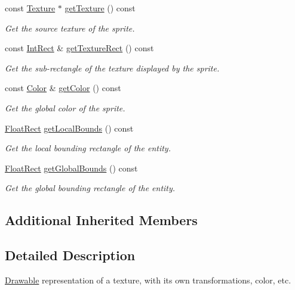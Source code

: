 \begin{DoxyCompactItemize}
const \hyperlink{classsf_1_1_texture}{Texture} $\ast$ \hyperlink{classsf_1_1_sprite_a1a76155146c8ff37c4eb5a306b4e9ebe}{get\+Texture} () const
\begin{DoxyCompactList}\small\item\em Get the source texture of the sprite. \end{DoxyCompactList}\item 
const \hyperlink{classsf_1_1_rect}{Int\+Rect} \& \hyperlink{classsf_1_1_sprite_a3492896fe7b63f58ae022c5b8bec5c98}{get\+Texture\+Rect} () const
\begin{DoxyCompactList}\small\item\em Get the sub-\/rectangle of the texture displayed by the sprite. \end{DoxyCompactList}\item 
const \hyperlink{classsf_1_1_color}{Color} \& \hyperlink{classsf_1_1_sprite_ac5f419f37b4e38f7a94186e3a3e303e1}{get\+Color} () const
\begin{DoxyCompactList}\small\item\em Get the global color of the sprite. \end{DoxyCompactList}\item 
\hyperlink{classsf_1_1_rect}{Float\+Rect} \hyperlink{classsf_1_1_sprite_ab2f4c781464da6f8a52b1df6058a48b8}{get\+Local\+Bounds} () const
\begin{DoxyCompactList}\small\item\em Get the local bounding rectangle of the entity. \end{DoxyCompactList}\item 
\hyperlink{classsf_1_1_rect}{Float\+Rect} \hyperlink{classsf_1_1_sprite_aa795483096b90745b2e799532963e271}{get\+Global\+Bounds} () const
\begin{DoxyCompactList}\small\item\em Get the global bounding rectangle of the entity. \end{DoxyCompactList}\end{DoxyCompactItemize}
\subsection*{Additional Inherited Members}


\subsection{Detailed Description}
\hyperlink{classsf_1_1_drawable}{Drawable} representation of a texture, with its own transformations, color, etc. 

